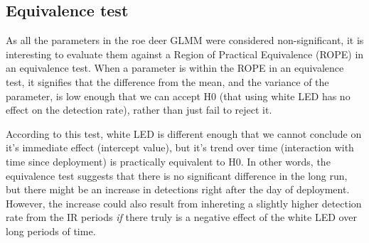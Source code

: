 \subsection{Equivalence test}

As all the parameters in the roe deer GLMM were considered non-significant, it is interesting to evaluate them against a Region of Practical Equivalence (ROPE) in an equivalence test.
When a parameter is within the ROPE in an equivalence test, it signifies that the difference from the mean, and the variance of the parameter, is low enough that we can accept H0 (that using white LED has no effect on the detection rate), rather than just fail to reject it.

According to this test, white LED is different enough that we cannot conclude on it’s immediate effect (intercept value), but it’s trend over time (interaction with time since deployment) is practically equivalent to H0. 
In other words, the equivalence test suggests that there is no significant difference in the long run, but there might be an increase in detections right after the day of deployment.
However, the increase could also result from inhereting a slightly higher detection rate from the IR periods \emph{if} there truly is a negative effect of the white LED over long periods of time.



